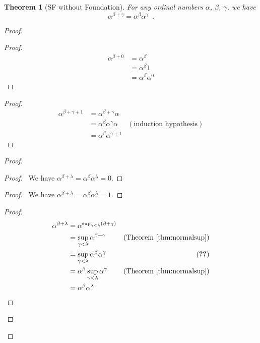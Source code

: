 \documentclass{book}
\let\qed\relax
\newtheorem{thm}[ax]{Theorem}
\theoremstyle{definition}
\begin{document}
\begin{thm}[SF without Foundation]
For any ordinal numbers $\alpha$, $\beta$, $\gamma$, we have
\[ \alpha^{\beta + \gamma} = \alpha^\beta \alpha^\gamma \enspace . \]
\end{thm}

\begin{proof}
\pf
{}
\begin{proof}
	\pf
	\begin{align*}
		\alpha^{\beta + 0} & = \alpha^\beta \\
		& = \alpha^\beta 1 \\
		& = \alpha^\beta \alpha^0
	\end{align*}
\end{proof}
\begin{proof}
	\pf
	\begin{align*}
		\alpha^{\beta + \gamma + 1} & = \alpha^{\beta + \gamma} \alpha \\
		& = \alpha^\beta \alpha^\gamma \alpha & (\text{induction hypothesis}) \\
		& = \alpha^\beta \alpha^{\gamma + 1}
	\end{align*}
\end{proof}
\begin{proof}
	\begin{proof}
		\pf\ We have $\alpha^{\beta + \lambda} = \alpha^\beta \alpha^\lambda = 0$.
	\end{proof}
	\begin{proof}
		\pf\ We have $\alpha^{\beta + \lambda} = \alpha^\beta \alpha^\lambda = 1$.
	\end{proof}
	\begin{proof}
		\pf
		\begin{align*}
			\alpha^{\beta + \lambda} & = \alpha^{\sup_{\gamma < \lambda} (\beta + \gamma)} \\
			& = \sup_{\gamma < \lambda} \alpha^{\beta + \gamma} & (\text{Theorem \ref{thm:normalsup}}) \\
			& = \sup_{\gamma < \lambda} \alpha^\beta \alpha^\gamma & (\text{\stepref{b}}) \\
			& = \alpha^\beta \sup_{\gamma < \lambda} \alpha^\gamma & (\text{Theorem \ref{thm:normalsup}}) \\
			& = \alpha^\beta \alpha^\lambda
		\end{align*}
	\end{proof}
\end{proof}
\qed
\end{proof}
\end{document}
